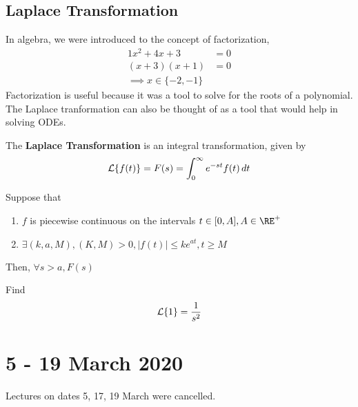 \documentclass[diffeq.tex]{subfiles}
\begin{document}
    \section{Laplace Transformation}
    In algebra, we were introduced to the concept of factorization,
    \begin{alignat}{1}
        x^{2} + 4x + 3 &= 0 \\
        (x + 3)(x + 1) &= 0 \\
        \implies x \in \{-2, -1\}
    \end{alignat}
    Factorization is useful because it was a tool to solve for the roots of a polynomial. The Laplace tranformation can also be thought of as a tool that would help in solving ODEs.

    \begin{definition}
        The \textbf{Laplace Transformation} is an integral transformation, given by
        \begin{equation}
            \mathcal{L}\{f(t)\} = F(s) = \int_{0}^{\infty}e^{-st}f(t)\,dt
        \end{equation}
    \end{definition}

    \begin{theorem} %
        Suppose that
        \begin{enumerate}
            \item $f$ is piecewise continuous on the intervals $t\in[0,A], A \in \RE^{+}$
            \item $\exists (k, a, M), (K, M) > 0, |f(t)| \leq ke^{at}, t \geq M$
        \end{enumerate}
        Then, $\forall s > a, F(s)$
    \end{theorem}
    \np
    \begin{example} %
        Find \begin{equation}
            \mathcal{L}\{1\} = \frac{1}{s^{2}}
        \end{equation}
    \end{example}
    \chapter*{5 - 19 March 2020}
    Lectures on dates 5, 17, 19 March were cancelled.
\end{document}
